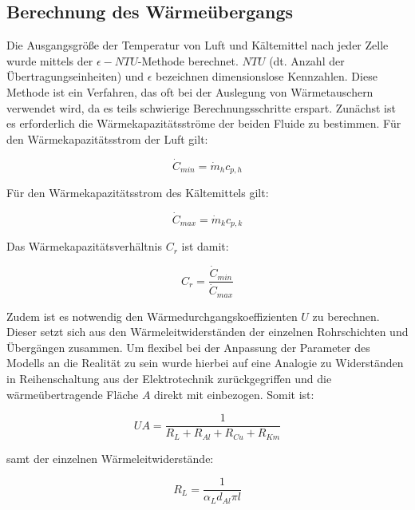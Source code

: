\subsection{Berechnung des Wärmeübergangs}
\label{subsec:Berechnung des Wärmeübergangs}

Die Ausgangsgröße der Temperatur von Luft und Kältemittel nach jeder Zelle wurde mittels der $\epsilon-NTU$-Methode berechnet\cite{SpringerVerlagGmbH.2013}\cite{Bergman.2011}\cite{Nellis.2009}. $NTU$ (dt. Anzahl der Übertragungseinheiten) und $\epsilon$ bezeichnen dimensionslose Kennzahlen. Diese Methode ist ein Verfahren, das oft bei der Auslegung von Wärmetauschern verwendet wird, da es teils schwierige Berechnungsschritte erspart. Zunächst ist es erforderlich die Wärmekapazitätsströme der beiden Fluide zu bestimmen. Für den Wärmekapazitätsstrom der Luft gilt:

\begin{equation}
\dot{C}_{min} = \dot{m}_h c_{p,h}
\end{equation} 

Für den Wärmekapazitätsstrom des Kältemittels gilt:

\begin{equation}
\dot{C}_{max} = \dot{m}_k c_{p,k}
\end{equation}
 
Das Wärmekapazitätsverhältnis $C_r$ ist damit:
 
\begin{equation}
C_r = \frac{\dot{C}_{min}}{\dot{C}_{max}}
\end{equation}

Zudem ist es notwendig den Wärmedurchgangskoeffizienten $U$ zu berechnen\cite{LehrstuhlfurWarmeundStoffubertragung.}. Dieser setzt sich aus den Wärmeleitwiderständen der einzelnen Rohrschichten und Übergängen zusammen. Um flexibel bei der Anpassung der Parameter des Modells an die Realität zu sein wurde hierbei auf eine Analogie zu Widerständen in Reihenschaltung aus der Elektrotechnik zurückgegriffen und die wärmeübertragende Fläche $A$ direkt mit einbezogen. Somit ist:

\begin{equation}
UA = \frac{1}{R_{L} + R_{Al} + R_{Cu} + R_{Km}}
\end{equation}
 
samt der einzelnen Wärmeleitwiderstände:

\begin{equation}
R_L = \frac{1}{\alpha_{L} d_{Al} \pi l}
\end{equation}


